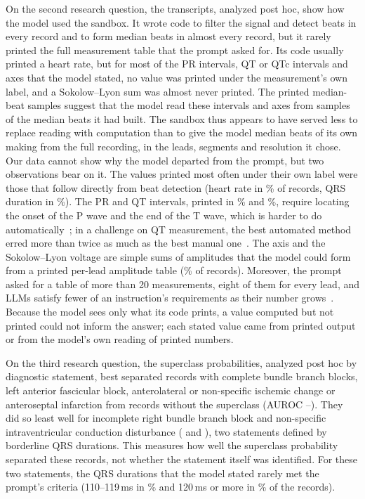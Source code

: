 On the second research question, the transcripts, analyzed post hoc, show how the model used the sandbox. It wrote code to filter the signal and detect
beats in every record and to form median beats in almost every record, but it rarely printed the full measurement
table that the prompt asked for. Its code usually printed a heart rate, but for most of the PR intervals, QT or QTc
intervals and axes that the model stated, no value was printed under the measurement's own label, and a Sokolow--Lyon sum
was almost never printed. The printed median-beat samples suggest that the model read these
intervals and axes from samples of the median beats it had built. The sandbox thus appears to have served less to
replace reading with computation than to give the model median beats of its own making from the full recording, in the
leads, segments and resolution it chose. Our data cannot show why the model departed from the prompt, but two
observations bear on it. The values printed most often under their own label were those that follow directly from beat
detection (heart rate in \PHPrintedHrPct\% of records, QRS duration in \PHPrintedQrsPct\%). The PR and QT intervals,
printed in \PHPrintedPrPct\% and \PHPrintedQtcPct\%, require locating the onset of the P wave and the end of the T wave,
which is harder to do automatically~\citep{martinez2004wavelet}; in a challenge on QT measurement, the best automated
method erred more than twice as much as the best manual one~\citep{moody2006qt}. The axis and the Sokolow--Lyon voltage
are simple sums of amplitudes that the model could form from a printed per-lead amplitude table (\PHLeadAmplitudePct\%
of records). Moreover, the prompt asked for a table of more than 20 measurements, eight of them for every lead, and
LLMs satisfy fewer of an instruction's requirements as their number grows~\citep{jiang2024followbench}. Because the
model sees only what its code prints, a value computed but not printed could not inform the answer; each stated value
came from printed output or from the model's own reading of printed numbers.

On the third research question, the superclass probabilities, analyzed post hoc by diagnostic statement, best separated records
with complete
bundle branch blocks, left anterior fascicular block, anterolateral or non-specific ischemic change or anteroseptal
infarction from records without the superclass (AUROC \PHStmtASMI--\PHStmtCRBBB). They did so least well for
incomplete right bundle branch block and non-specific intraventricular conduction disturbance (\PHStmtIRBBB{} and
\PHStmtIVCD), two statements defined by borderline QRS durations. This measures how well the superclass probability
separated these records, not whether the statement itself was identified. For these two statements, the QRS durations
that the model stated rarely met the prompt's criteria (110--119\,ms in \PHMeasIRBBBCodeCrit\% and 120\,ms or more in
\PHMeasIVCDCodeCrit\% of the records).

